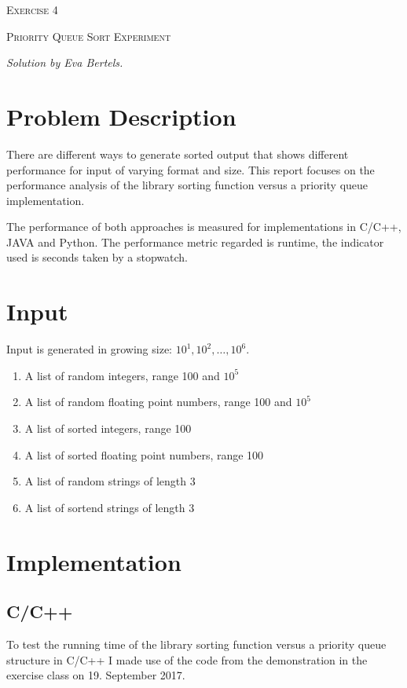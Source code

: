 \documentclass[
    12pt,
    a4paper,
    oneside, 
    headinclude,footinclude,
    BCOR5mm,
]{scrartcl}
\begin{document}
\begin{centering}
    {\scshape \LARGE Exercise 4 \par}
    {\scshape Priority Queue Sort Experiment \par}
    {\itshape \small Solution by Eva Bertels. \par}
\end{centering}

\section*{Problem Description}
There are different ways to generate sorted output that shows different performance for input of varying format and size. 
This report focuses on the performance analysis of the library sorting function versus a priority queue implementation.

The performance of both approaches is measured for implementations in C/C++, JAVA and Python. 
The performance metric regarded is runtime, the indicator used is seconds taken by a stopwatch.

\section*{Input}
Input is generated in growing size: $10^{1}, 10^{2}, \ldots , 10^{6}$.

\begin{enumerate}
\item A list of random integers, range 100 and $10^5$
\item A list of random floating point numbers, range 100 and $10^5$
\item A list of sorted integers, range 100
\item A list of sorted floating point numbers, range 100
\item A list of random strings of length 3
\item A list of sortend strings of length 3
\end{enumerate}


\section*{Implementation}

\subsection*{C/C++}

To test the running time of the library sorting function versus a priority queue structure in C/C++ I made use of the code from the demonstration in the exercise class on 19. September 2017. 
\end{document}
